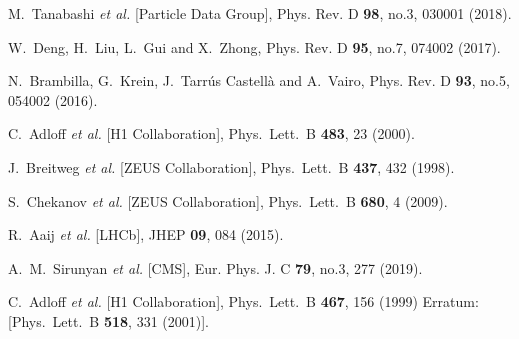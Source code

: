 \documentclass[prd,amsmath,%
twocolumn,floatfix,amssymb, preprintnumbers, linenumbers,nofootinbib, superscriptaddress]{revtex4}
\begin{document}
\begin{thebibliography}{99}
M.~Tanabashi \textit{et al.} [Particle Data Group],
Phys. Rev. D \textbf{98}, no.3, 030001 (2018). 


W.~Deng, H.~Liu, L.~Gui and X.~Zhong,
Phys. Rev. D \textbf{95}, no.7, 074002 (2017). 

N.~Brambilla, G.~Krein, J.~Tarrús Castellà and A.~Vairo,
Phys. Rev. D \textbf{93}, no.5, 054002 (2016).

 
  C.~Adloff {\it et al.} [H1 Collaboration],
  Phys.\ Lett.\ B {\bf 483}, 23 (2000).



  J.~Breitweg {\it et al.} [ZEUS Collaboration],
  Phys.\ Lett.\ B {\bf 437}, 432 (1998).
 

  S.~Chekanov {\it et al.} [ZEUS Collaboration],
  Phys.\ Lett.\ B {\bf 680}, 4 (2009).
 

R.~Aaij {\it et al.} [LHCb],
JHEP \textbf{09}, 084 (2015). 


A.~M.~Sirunyan {\it et al.} [CMS],
Eur. Phys. J. C \textbf{79}, no.3, 277 (2019). 


  C.~Adloff {\it et al.} [H1 Collaboration],
  Phys.\ Lett.\ B {\bf 467}, 156 (1999)
  Erratum: [Phys.\ Lett.\ B {\bf 518}, 331 (2001)].
 


\end{thebibliography}
\end{document}
